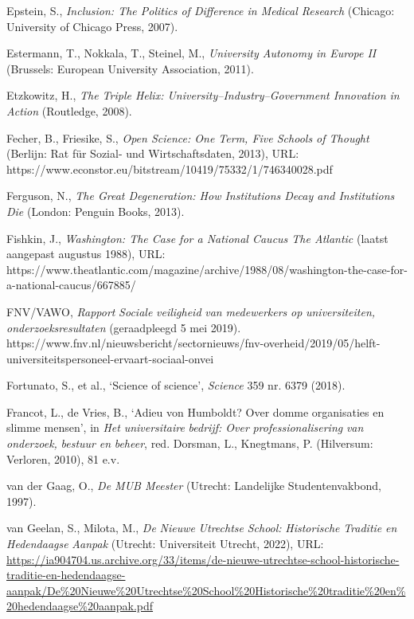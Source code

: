 \documentclass[smallauthor, chapterhaspagenum, nochapterinheader, pagenuminheader,  bigchapnum,medium2, tocpages, garamond, titleinheader]{jote-book}
\begin{document}
\begin{references}
		Epstein, S., \emph{Inclusion: The Politics of Difference in Medical Research} (Chicago: University of Chicago Press, 2007).



		Estermann, T., Nokkala, T., Steinel, M., \emph{University Autonomy in Europe II} (Brussels: European University Association, 2011).



		Etzkowitz, H., \emph{The Triple Helix: University--Industry--Government Innovation in Action }(Routledge, 2008).



		Fecher, B., Friesike, S., \emph{Open Science: One Term, Five Schools of Thought} (Berlijn: Rat für Sozial- und Wirtschaftsdaten, 2013), URL: https://www.econstor.eu/bitstream/10419/75332/1/746340028.pdf



		Ferguson, N., \emph{The Great Degeneration: How Institutions Decay and Institutions Die} (London: Penguin Books, 2013).



		Fishkin, J., \emph{Washington: The Case for a National Caucus The Atlantic} (laatst aangepast augustus 1988), URL: https://www.theatlantic.com/magazine/archive/1988/08/washington-the-case-for-a-national-caucus/667885/



		FNV/VAWO, \emph{Rapport }\emph{Sociale}\emph{ }\emph{veiligheid}\emph{ van }\emph{medewerkers}\emph{ op }\emph{universiteiten}\emph{, }\emph{onderzoeksresultaten} (geraadpleegd 5 mei 2019). https://www.fnv.nl/nieuwsbericht/sectornieuws/fnv-overheid/2019/05/helft-universiteitspersoneel-ervaart-sociaal-onvei



		Fortunato, S., et al., ‘Science of science', \emph{Science }359 nr. 6379 (2018).



		Francot, L., de Vries, B., ‘Adieu von Humboldt? Over domme organisaties en slimme mensen', in \emph{Het }\emph{universitaire}\emph{ }\emph{bedrijf}\emph{: Over }\emph{professionalisering}\emph{ van }\emph{onderzoek}\emph{, }\emph{bestuur}\emph{ }\emph{en}\emph{ }\emph{beheer}, red. Dorsman, L., Knegtmans, P. (Hilversum: Verloren, 2010), 81 e.v.



		van der Gaag, O., \emph{De MUB Meester} (Utrecht: Landelijke Studentenvakbond, 1997).



		van Geelan, S., Milota, M., \emph{De }\emph{Nieuwe}\emph{ }\emph{Utrechtse}\emph{ School: }\emph{Historische}\emph{ }\emph{Traditie}\emph{ }\emph{en}\emph{ }\emph{Hedendaagse}\emph{ }\emph{Aanpak}\emph{ }(Utrecht: Universiteit Utrecht, 2022), URL: \href{https://ia904704.us.archive.org/33/items/de-nieuwe-utrechtse-school-historische-traditie-en-hedendaagse-aanpak/De\%20Nieuwe\%20Utrechtse\%20School\%20Historische\%20traditie\%20en\%20hedendaagse\%20aanpak.pdf}{https://ia904704.us.archive.org/33/items/de-nieuwe-utrechtse-school-historische-traditie-en-hedendaagse-aanpak/De\%20Nieuwe\%20Utrechtse\%20School\%20Historische\%20traditie\%20en\%20hedendaagse\%20aanpak.pdf}




\end{references}
\end{document}
